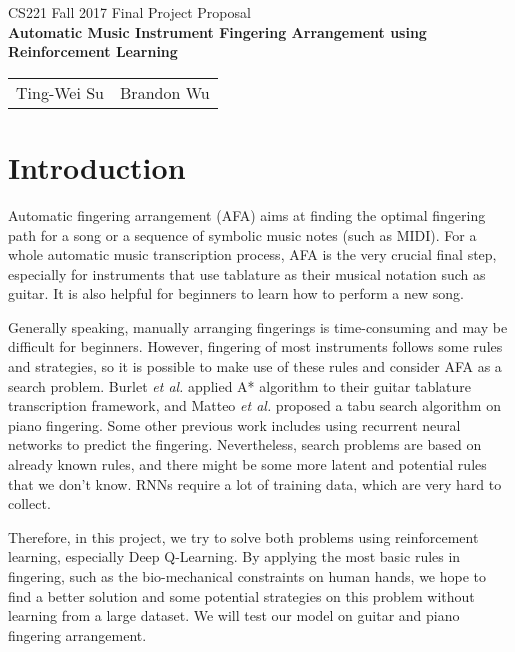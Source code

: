 \documentclass[12pt]{article}
\begin{document}
\begin{center}
{\Large CS221 Fall 2017 Final Project Proposal\\}
{\Large \textbf{Automatic Music Instrument Fingering Arrangement using Reinforcement Learning}}

\begin{tabular}{ll}
Ting-Wei Su & Brandon Wu \\
\end{tabular}
\end{center}

\section*{Introduction}

Automatic fingering arrangement (AFA) aims at finding the optimal fingering path for a song or a sequence of symbolic music notes (such as MIDI). 
For a whole automatic music transcription process, AFA is the very crucial final step, especially for instruments that use tablature as their musical notation such as guitar. It is also helpful for beginners to learn how to perform a new song. 

Generally speaking, manually arranging fingerings is time-consuming and may be difficult for beginners. 
However, fingering of most instruments follows some rules and strategies, so it is possible to make use of these rules and consider AFA as a search problem. Burlet \textit{et al.} applied A* algorithm to their guitar tablature transcription framework, and Matteo \textit{et al.} proposed a tabu search algorithm on piano fingering. 
Some other previous work includes using recurrent neural networks to predict the fingering. 
Nevertheless, search problems are based on already known rules, and there might be some more latent and potential rules that we don't know. RNNs require a lot of training data, which are very hard to collect. 

Therefore, in this project, we try to solve both problems using reinforcement learning, especially Deep Q-Learning. By applying the most basic rules in fingering, such as the bio-mechanical constraints on human hands, we hope to find a better solution and some potential strategies on this problem without learning from a large dataset. We will test our model on guitar and piano fingering arrangement.
\end{document}
